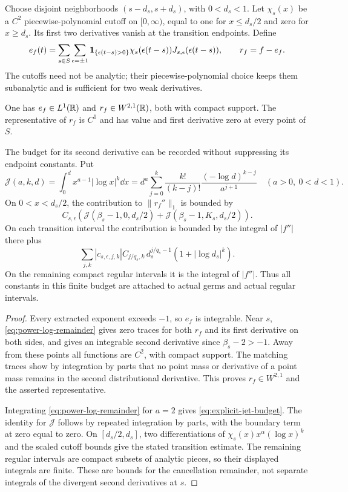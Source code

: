Choose disjoint neighborhoods $(s-d_s,s+d_s)$, with $0<d_s<1$.
Let $\chi_s(x)$ be a $C^2$ piecewise-polynomial cutoff on $[0,\infty)$,
equal to one for $x\le d_s/2$ and zero for $x\ge d_s$. Its first two
derivatives vanish at the transition endpoints. Define
\begin{equation}\label{eq:full-finite-jet-density}
 e_f(t)=\sum_{s\in S}\sum_{\epsilon=\pm1}
  \one_{\{\epsilon(t-s)>0\}}\chi_s(\epsilon(t-s))
                         J_{s,\epsilon}(\epsilon(t-s)),
 \qquad r_f=f-e_f.
\end{equation}
The cutoffs need not be analytic; their piecewise-polynomial choice
keeps them subanalytic and is sufficient for two weak derivatives.

\begin{proposition}
\label{prop:finite-jet-subtraction}
One has $e_f\in L^1(\mathbb R)$ and $r_f\in W^{2,1}(\mathbb R)$, both with compact
support. The representative of $r_f$ is $C^1$ and has value and first
derivative zero at every point of $S$.

The budget for its second derivative can be recorded without suppressing
its endpoint constants. Put
\[
 \mathcal J(a,k,d)=\int_0^d x^{a-1}|\log x|^k\dd x
 =d^a\sum_{j=0}^k\frac{k!}{(k-j)!}
                      \frac{(-\log d)^{k-j}}{a^{j+1}}
 \quad(a>0,\ 0<d<1).
\]
On $0<x<d_s/2$, the contribution to $\|r_f''\|_1$ is bounded by
\begin{equation}\label{eq:explicit-jet-budget}
 C_{s,\epsilon}\left(
   \mathcal J(\beta_s-1,0,d_s/2)
  +\mathcal J(\beta_s-1,K_s,d_s/2)\right).
\end{equation}
On each transition interval the contribution is bounded by the integral
of $|f''|$ there plus
\[
 \sum_{j,k}|c_{s,\epsilon,j,k}|C_{j/q_s,k}\,
                d_s^{j/q_s-1}(1+|\log d_s|^k).
\]
On the remaining compact regular intervals it is the integral of
$|f''|$. Thus all constants in this finite budget are attached to actual
germs and actual regular intervals.
\end{proposition}
\begin{proof}
Every extracted exponent exceeds $-1$, so $e_f$ is integrable.
Near $s$, \eqref{eq:power-log-remainder} gives zero traces for both
$r_f$ and its first derivative on both sides, and gives an integrable
second derivative since $\beta_s-2>-1$. Away from these points all
functions are $C^2$, with compact support. The matching traces show by
integration by parts that no point mass or derivative of a point mass
remains in the second distributional derivative. This proves
$r_f\in W^{2,1}$ and the asserted representative.

Integrating \eqref{eq:power-log-remainder} for $a=2$ gives
\eqref{eq:explicit-jet-budget}. The identity for $\mathcal J$ follows
by repeated integration by parts, with the boundary term at zero equal
to zero. On $[d_s/2,d_s]$, two differentiations of
$\chi_s(x)x^\alpha(\log x)^k$ and the scaled cutoff bounds give the
stated transition estimate. The remaining regular intervals are
compact subsets of analytic pieces, so their displayed integrals are
finite. These are bounds for the cancellation remainder, not separate
integrals of the divergent second derivatives at $s$.
\end{proof}


